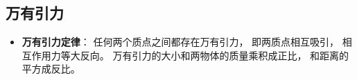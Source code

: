 \subsection{万有引力}
\begin{itemize}
\item \textbf{万有引力定律}： 任何两个质点之间都存在万有引力， 即两质点相互吸引， 相互作用力等大反向。 万有引力的大小和两物体的质量乘积成正比， 和距离的平方成反比。
\end{itemize}
